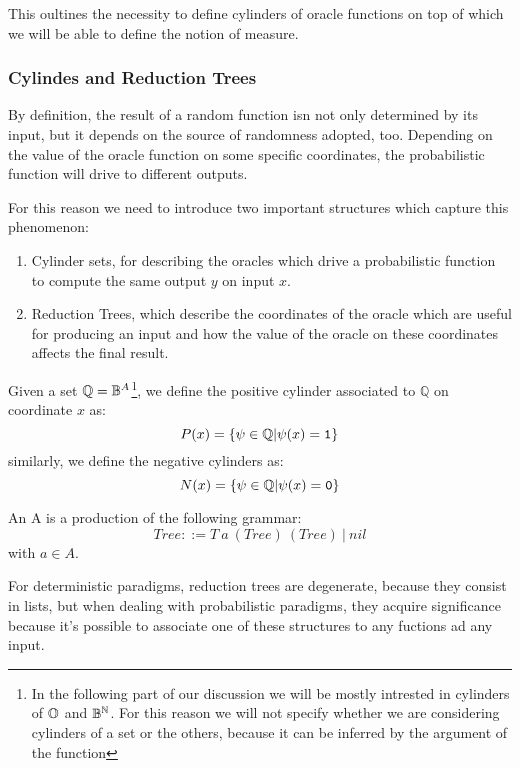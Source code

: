 \begin{conditional}{\notappendix}
  This oultines the necessity to define cylinders of oracle functions on top
  of which we will be able to define the notion of measure.

\subsubsection{Cylindes and Reduction Trees}

By definition, the result of a random function isn not only determined
by its input, but it depends on the source of randomness adopted, too.
Depending on the value of the oracle function on some specific coordinates,
the probabilistic function will drive to different outputs.

For this reason we need to introduce two important structures which capture this
phenomenon:

\begin{enumerate}
  \item Cylinder sets, for describing the oracles which drive a probabilistic
  function to compute the same output $y$ on input $x$.
  \item Reduction Trees, which describe the coordinates of the oracle which are useful
  for producing an input and how the value of the oracle on these coordinates
  affects the final result.
\end{enumerate}

  \begin{defn}
    Given a set $\mathbb Q= \mathbb{B}^A$\footnote{  In the following part of our discussion we will be mostly intrested in cylinders
      of $\mathbb{O}$ and $\mathbb{B}^{\mathbb{N}}$. For this reason we will not specify whether we are considering
      cylinders of a set or the others, because it can be inferred by the argument of the function
}, we define the positive
    cylinder associated to $\mathbb Q$ on coordinate $x$ as:
    \[
      P(x) = \{ \psi \in \mathbb Q | \psi(x)= \mathtt{1} \}
    \]
    similarly, we define the negative cylinders as:
    \[
      N(x) = \{ \psi \in \mathbb Q | \psi(x)= \mathtt{0} \}
    \]
  \end{defn}


  \begin{defn}
    An \rt A is a production of the following grammar:
    \[
    \mathit{Tree}::= \mathit T\ a\ (\mathit{Tree})\ (\mathit{Tree})\ |\ \mathit{nil}
    \]
    with $a \in A$.
  \end{defn}

  For deterministic paradigms, reduction trees are degenerate, because
  they consist in lists, but when dealing with probabilistic paradigms, they
  acquire significance because it's possible to associate one of these structures
  to any fuctions ad any input.


\end{conditional}
